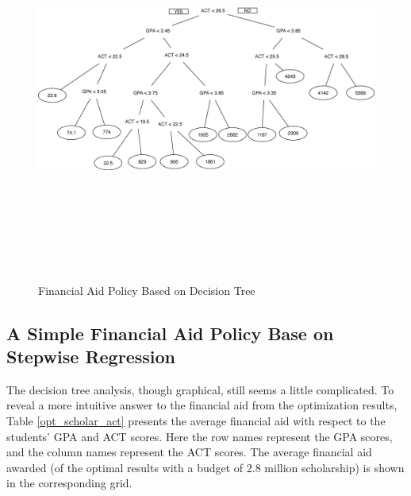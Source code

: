\documentclass[12pt,english]{report}
\begin{document}
 
\begin{figure}
\includegraphics[width=7in, height=5in]{pic/FA_DT_Result.eps}%
\caption{Financial Aid Policy Based on Decision Tree }
\label{FApolicybyDT}
\end{figure}
 

% 

\subsection{A Simple Financial Aid Policy Base on Stepwise Regression}
The decision tree analysis, though graphical, still seems a little complicated.
To reveal 
a more intuitive answer to the financial aid from the optimization results,
Table
\ref{opt_scholar_act} presents the average financial aid with respect to the
students'
GPA and ACT scores. Here the row names represent the GPA scores, and the column
names 
represent the ACT scores. The average financial aid awarded (of the optimal
results with 
a budget of 2.8 million scholarship) is shown in the corresponding grid.
\end{document}
